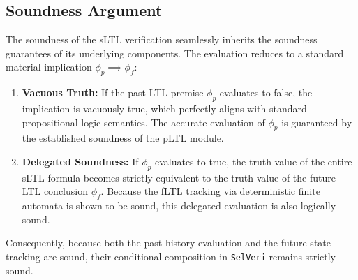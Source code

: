 \documentclass{article}
\begin{document}
\subsection{Soundness Argument}
The soundness of the sLTL verification seamlessly inherits the soundness guarantees of its underlying components. The evaluation reduces to a standard material implication $\phi_p \implies \phi_f$:
\begin{enumerate}
    \item \textbf{Vacuous Truth:} If the past-LTL premise $\phi_p$ evaluates to false, the implication is vacuously true, which perfectly aligns with standard propositional logic semantics. The accurate evaluation of $\phi_p$ is guaranteed by the established soundness of the pLTL module.
    \item \textbf{Delegated Soundness:} If $\phi_p$ evaluates to true, the truth value of the entire sLTL formula becomes strictly equivalent to the truth value of the future-LTL conclusion $\phi_f$. Because the fLTL tracking via deterministic finite automata is shown to be sound, this delegated evaluation is also logically sound.
\end{enumerate}
Consequently, because both the past history evaluation and the future state-tracking are sound, their conditional composition in \texttt{SelVeri} remains strictly sound.
\end{document}
